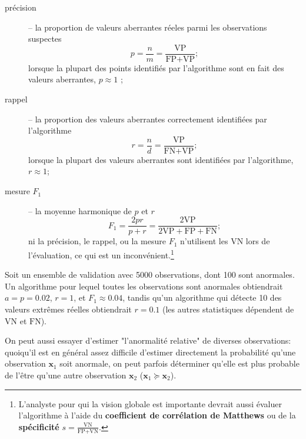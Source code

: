 \begin{description}
\item[pr\'ecision]-- la proportion de valeurs aberrantes r\'eeles parmi les observations suspectes $$p=\frac{n}{m}=\frac{\text{VP}}{\text{FP}+\text{VP}};$$ lorsque la plupart des points identifiés par l'algorithme sont en fait des valeurs aberrantes, $p\approx 1$ ;
\item[rappel]-- la proportion des valeurs aberrantes correctement identifi\'ees par l'algorithme
$$r=\frac{n}{d}=\frac{\text{VP}}{\text{FN}+\text{VP}};$$ lorsque la plupart des valeurs aberrantes sont identifi\'ees par l'algorithme, $r\approx 1$;
\item[mesure $F_1$]-- la moyenne harmonique de $p$ et $r$ 
$$F_1=\frac{2pr}{p+r}=\frac{2\text{VP}}{2\text{VP}+\text{FP}+\text{FN}};$$ ni la précision, le rappel, ou la mesure $F_1$ n'utilisent les $\text{VN}$ lors de l'évaluation, ce qui est un inconv\'enient.\footnote{L'analyste pour qui la vision globale est importante devrait aussi évaluer l'algorithme à l'aide du \textbf{coefficient de corrélation de Matthews} \cite{W_MCC} ou de la \textbf{sp\'ecificit\'e} $s=\frac{\text{VN}}{\text{FP}+\text{VN}}$.}
\end{description}
\begin{Exemple}Soit un ensemble de validation avec 5000 ob\-ser\-va\-tions, dont 100 sont anormales. Un algorithme pour lequel toutes les ob\-ser\-va\-tions sont anormales obtiendrait $a=p=0.02$, $r=1$, et $F_1\approx 0.04$, tandis qu'un algorithme qui détecte 10 des valeurs extrêmes réelles obtiendrait $r=0.1$ (les autres statistiques d\'ependent de $\text{VN}$ et $\text{FN}$).
\end{Exemple}
\newpage \noindent On peut aussi essayer d'estimer "l'anormalit\'e  relative" de diverses ob\-ser\-va\-tions: quoiqu'il est en g\'en\'eral assez difficile d'estimer directement la probabilité qu'une ob\-ser\-va\-tion $\mathbf{x}_1$ soit anormale, on peut parfois d\'eterminer qu'elle est plus probable de l'\^etre qu'une autre ob\-ser\-va\-tion $\mathbf{x}_2$ ($\mathbf{x}_1\succeq \mathbf{x}_2$).\label{succeq} %
